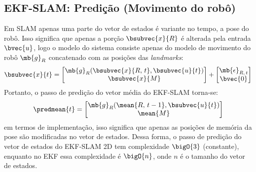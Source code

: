 \subsection{EKF-SLAM: Predição (Movimento do robô)}
\label{sec:ekf-slam-prediction}
Em SLAM apenas uma parte do vetor de estados é variante no tempo, a pose do 
robô. Isso significa que apenas a porção $\bsubvec{x}{R}$ é alterada pela entrada $\bvec{u}$, logo o modelo do sistema consiste apenas do modelo de 
movimento do robô $\mb{g}_R$ concatenado com as posições das \textit{landmarks}:
\begin{equation}
  \bsubvec{x}{t} = \begin{bmatrix}
    \mb{g}_R(\bsubvec{x}{R, \,t}, \bsubvec{u}{t}) \\
    \bsubvec{x}{M}
  \end{bmatrix} + \begin{bmatrix} 
      \mb{\epsilon}_{R, \,t} \\
      \bvec{0}
  \end{bmatrix}
  \label{eq:slam-prediction}
\end{equation}
Portanto, o passo de predição do vetor média do EKF-SLAM torna-se:
\begin{equation}
  \predmean{t} = \begin{bmatrix}
    \mb{g}_R(\mean{R, \,t-1}, \bsubvec{u}{t}) \\
      \mean{M}
  \end{bmatrix}
\end{equation}
em termos de implementação, isso significa que apenas as posições de memória da 
pose são modificadas no vetor de estados. Dessa forma, o passo de predição do 
vetor de estados do EKF-SLAM 2D tem complexidade $\bigO{3}$ (constante), enquanto no EKF 
essa complexidade é $\bigO{n}$, onde $n$ é o tamanho do vetor de estados.

